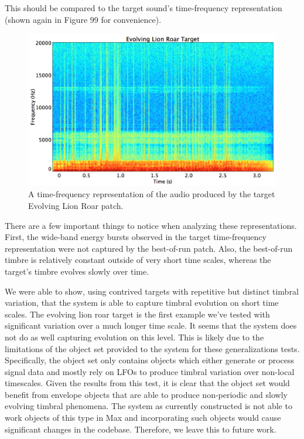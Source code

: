 \documentclass[12pt]{report} 	%
\numberwithin{figure}{chapter}
\numberwithin{table}{chapter}
\numberwithin{equation}{chapter}
\begin{document}
\begin{flushleft}
\begin{figure}[h!]
\end{figure}
This should be compared to the target sound's time-frequency representation (shown again in Figure 99 for convenience).
\begin{figure}[h!]
\begin{center}
\includegraphics[scale=0.35,width=\linewidth]{EvolvingLionRoarTargetSTFT}
\caption[Target evolving lion roar time-frequency representation]{A time-frequency representation of the audio produced by the target Evolving Lion Roar patch.}
\end{center}
\end{figure}

There are a few important things to notice when analyzing these representations. First, the wide-band energy bursts observed in the target time-frequency representation were not captured by the best-of-run patch. Also, the best-of-run timbre is relatively constant outside of very short time scales, whereas the target's timbre evolves slowly over time. 

We were able to show, using contrived targets with repetitive but distinct timbral variation, that the system is able to capture timbral evolution on short time scales. The evolving lion roar target is the first example we've tested with significant variation over a much longer time scale. It seems that the system does not do as well capturing evolution on this level. This is likely due to the limitations of the object set provided to the system for these generalizations tests. Specifically, the object set only contains objects which either generate or process signal data and mostly rely on LFOs to produce timbral variation over non-local timescales. Given the results from this test, it is clear that the object set would benefit from envelope objects that are able to produce non-periodic and slowly evolving timbral phenomena. The system as currently constructed is not able to work objects of this type in Max and incorporating such objects would cause significant changes in the codebase. Therefore, we leave this to future work.


\end{flushleft}
\end{document}

